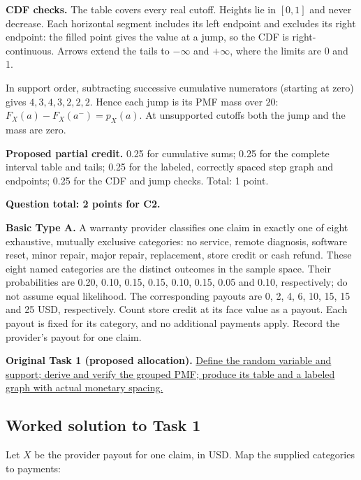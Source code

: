 \textbf{CDF checks.} The table covers every real cutoff. Heights lie in $[0,1]$ and never decrease. Each horizontal segment includes its left endpoint and excludes its right endpoint: the filled point gives the value at a jump, so the CDF is right-continuous. Arrows extend the tails to $-\infty$ and $+\infty$, where the limits are 0 and 1.

In support order, subtracting successive cumulative numerators (starting at zero) gives $4,3,4,3,2,2,2$. Hence each jump is its PMF mass over $20$: $F_X(a)-F_X(a^-)=p_X(a)$. At unsupported cutoffs both the jump and the mass are zero.

\textbf{Proposed partial credit.} 0.25 for cumulative sums; 0.25 for the complete interval table and tails; 0.25 for the labeled, correctly spaced step graph and endpoints; 0.25 for the CDF and jump checks. Total: 1 point.

\par\vspace{3mm}\secInicio[][sec:q3]

\textbf{Question total: 2 points for C2.}

\clearpage
{}

\textbf{Basic Type A.} A warranty provider classifies one claim in exactly one of eight exhaustive, mutually exclusive categories: no service, remote diagnosis, software reset, minor repair, major repair, replacement, store credit or cash refund. These eight named categories are the distinct outcomes in the sample space. Their probabilities are 0.20, 0.10, 0.15, 0.15, 0.10, 0.15, 0.05 and 0.10, respectively; do not assume equal likelihood. The corresponding payouts are 0, 2, 4, 6, 10, 15, 15 and 25 USD, respectively. Count store credit at its face value as a payout. Each payout is fixed for its category, and no additional payments apply. Record the provider's payout for one claim.

\textbf{Original Task 1 (proposed allocation).} \hyperref[sol:q4t1]{Define the random variable and support; derive and verify the grouped PMF; produce its table and a labeled graph with actual monetary spacing.} 


\subsection*{Worked solution to Task 1 }
\label{sol:q4t1}

Let $X$ be the provider payout for one claim, in USD. Map the supplied categories to payments:

